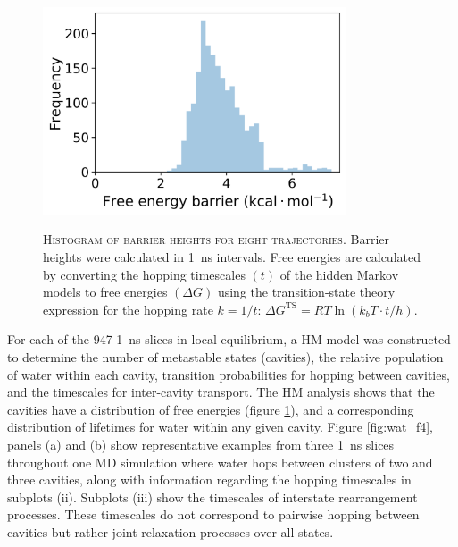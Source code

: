 \begin{figure}
    \centering
    \caption[Histogram of barrier heights for eight trajectories]{\textsc{Histogram of barrier heights for eight trajectories}. Barrier heights were calculated in \SI{1}{\nano\second} intervals. Free energies are calculated by converting the hopping timescales $(t)$ of the hidden Markov models to free energies $(\Delta G)$ using the transition-state theory expression for the hopping rate $k=1/t$: $\Delta G^{\mathrm{TS}}=R T \ln \left(k_{b} T \cdot t / h\right)$.}
    \includegraphics[width=0.8\textwidth]{chapters/water_hopping/figures/Fig_S10.png}
    \label{fig:wat_s9}
\end{figure}

For each of the \num{947} \SI{1}{\nano\second} slices in local equilibrium, a HM model was constructed to determine the number of metastable states (cavities), the relative population of water within each cavity, transition probabilities for hopping between cavities, and the timescales for inter-cavity transport. The HM analysis shows that the cavities have a distribution of free energies (figure \ref{fig:wat_s9}), and a corresponding distribution of lifetimes for water within any given cavity. Figure \ref{fig:wat_f4}, panels (a) and (b) show representative examples from three \SI{1}{\nano\second} slices throughout one MD simulation where water hops between clusters of two and three cavities, along with information regarding the hopping timescales in subplots (ii). Subplots (iii) show the timescales of interstate rearrangement processes. These timescales do not correspond to pairwise hopping between cavities but rather joint relaxation processes over all states.


